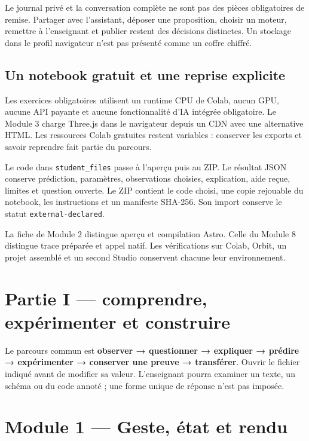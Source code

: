 \documentclass[
  canadien,
  11pt,
  a4paper,
]{report}
\begin{document}
Le journal privé et la conversation complète ne sont pas des pièces
obligatoires de remise. Partager avec l'assistant, déposer une
proposition, choisir un moteur, remettre à l'enseignant et publier
restent des décisions distinctes. Un stockage dans le profil navigateur
n'est pas présenté comme un coffre chiffré.

\section{Un notebook gratuit et une reprise
explicite}\label{un-notebook-gratuit-et-une-reprise-explicite}

Les exercices obligatoires utilisent un runtime CPU de Colab, aucun GPU,
aucune API payante et aucune fonctionnalité d'IA intégrée obligatoire.
Le Module 3 charge Three.js dans le navigateur depuis un CDN avec une
alternative HTML. Les ressources Colab gratuites restent variables :
conserver les exports et savoir reprendre fait partie du parcours.

Le code dans \texttt{student\_\allowbreak{}files} passe à l'aperçu puis au ZIP. Le
résultat JSON conserve prédiction, paramètres, observations choisies,
explication, aide reçue, limites et question ouverte. Le ZIP contient le
code choisi, une copie rejouable du notebook, les instructions et un
manifeste SHA-256. Son import conserve le statut
\texttt{external-declared}.

La fiche de Module 2 distingue aperçu et compilation Astro. Celle du
Module 8 distingue trace préparée et appel natif. Les vérifications sur
Colab, Orbit, un projet assemblé et un second Studio conservent chacune
leur environnement.

\chapter{Partie I --- comprendre, expérimenter et
construire}\label{partie-i-comprendre-expuxe9rimenter-et-construire}

Le parcours commun est \textbf{observer → questionner → expliquer →
prédire → expérimenter → conserver une preuve → transférer}. Ouvrir le
fichier indiqué avant de modifier sa valeur. L'enseignant pourra
examiner un texte, un schéma ou du code annoté ; une forme unique de
réponse n'est pas imposée.

\chapter{Module 1 --- Geste, état et
rendu}\label{module-1-geste-uxe9tat-et-rendu}
\end{document}
